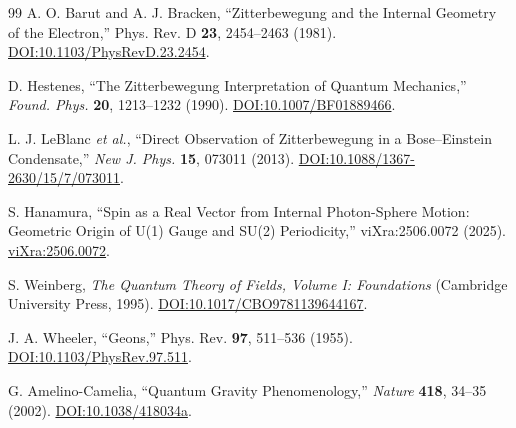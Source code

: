 \documentclass[%
 reprint,
 amsmath,amssymb,
 aps,
]{revtex4-1}
\numberwithin{equation}{section}%
\begin{document}
\begin{thebibliography}{99}
A. O. Barut and A. J. Bracken, ``Zitterbewegung and the Internal Geometry of the Electron,'' Phys. Rev. D \textbf{23}, 2454--2463 (1981). \href{https://doi.org/10.1103/PhysRevD.23.2454}{DOI:10.1103/PhysRevD.23.2454}.

D. Hestenes, ``The Zitterbewegung Interpretation of Quantum Mechanics,'' \textit{Found. Phys.} \textbf{20}, 1213--1232 (1990). \href{https://doi.org/10.1007/BF01889466}{DOI:10.1007/BF01889466}.

L. J. LeBlanc \textit{et al.}, ``Direct Observation of Zitterbewegung in a Bose--Einstein Condensate,'' \textit{New J. Phys.} \textbf{15}, 073011 (2013). \href{https://doi.org/10.1088/1367-2630/15/7/073011}{DOI:10.1088/1367-2630/15/7/073011}.

S. Hanamura, ``Spin as a Real Vector from Internal Photon-Sphere Motion: Geometric Origin of U(1) Gauge and SU(2) Periodicity,'' viXra:2506.0072 (2025). \href{https://vixra.org/abs/2506.0072}{viXra:2506.0072}.

S. Weinberg, \textit{The Quantum Theory of Fields, Volume I: Foundations} (Cambridge University Press, 1995). \href{https://doi.org/10.1017/CBO9781139644167}{DOI:10.1017/CBO9781139644167}.

J. A. Wheeler, ``Geons,'' Phys. Rev. \textbf{97}, 511--536 (1955). \href{https://doi.org/10.1103/PhysRev.97.511}{DOI:10.1103/PhysRev.97.511}.

G. Amelino-Camelia, ``Quantum Gravity Phenomenology,'' \textit{Nature} \textbf{418}, 34--35 (2002). \href{https://doi.org/10.1038/418034a}{DOI:10.1038/418034a}.

\end{thebibliography}
\end{document}
